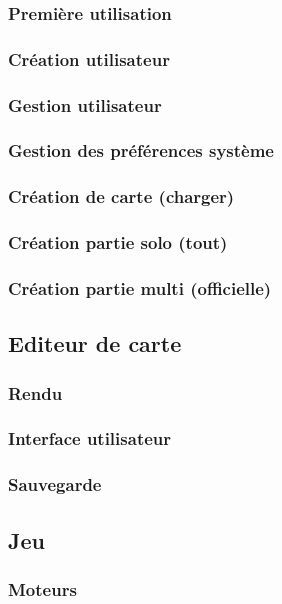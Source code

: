\documentclass[a4paper,11pt]{report}
\begin{document}
			\subsubsection{Première utilisation}
			\subsubsection{Création utilisateur}
			\subsubsection{Gestion utilisateur}
			\subsubsection{Gestion des préférences système}
			\subsubsection{Création de carte (charger)}
			\subsubsection{Création partie solo (tout)}
			\subsubsection{Création partie multi (officielle)}
			
		\subsection{Editeur de carte}
			\subsubsection{Rendu}
			\subsubsection{Interface utilisateur}
			\subsubsection{Sauvegarde}
		\subsection{Jeu}
			\subsubsection{Moteurs}
\end{document}
